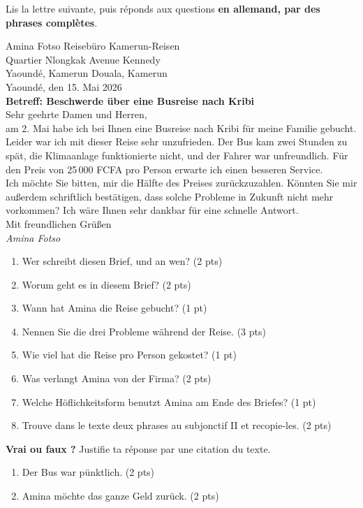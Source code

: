 \documentclass[11pt]{article}
\begin{document}
\begin{exercice}
Lis la lettre suivante, puis réponds aux questions \textbf{en allemand, par des phrases complètes}.
\begin{textebox}
Amina Fotso \hfill Reisebüro Kamerun-Reisen\\
Quartier Nlongkak \hfill Avenue Kennedy\\
Yaoundé, Kamerun \hfill Douala, Kamerun\\[4pt]
Yaoundé, den 15. Mai 2026\\[4pt]
\textbf{Betreff: Beschwerde über eine Busreise nach Kribi}\\[4pt]
Sehr geehrte Damen und Herren,\\[4pt]
am 2. Mai habe ich bei Ihnen eine Busreise nach Kribi für meine Familie gebucht. Leider war ich mit dieser Reise sehr unzufrieden. Der Bus kam zwei Stunden zu spät, die Klimaanlage funktionierte nicht, und der Fahrer war unfreundlich. Für den Preis von 25\,000 FCFA pro Person erwarte ich einen besseren Service.\\[4pt]
Ich möchte Sie bitten, mir die Hälfte des Preises zurückzuzahlen. Könnten Sie mir außerdem schriftlich bestätigen, dass solche Probleme in Zukunft nicht mehr vorkommen? Ich wäre Ihnen sehr dankbar für eine schnelle Antwort.\\[4pt]
Mit freundlichen Grüßen\\
\emph{Amina Fotso}
\end{textebox}
\begin{enumerate}
\item Wer schreibt diesen Brief, und an wen? (2 pts)
\item Worum geht es in diesem Brief? (2 pts)
\item Wann hat Amina die Reise gebucht? (1 pt)
\item Nennen Sie die drei Probleme während der Reise. (3 pts)
\item Wie viel hat die Reise pro Person gekostet? (1 pt)
\item Was verlangt Amina von der Firma? (2 pts)
\item Welche Höflichkeitsform benutzt Amina am Ende des Briefes? (1 pt)
\item Trouve dans le texte deux phrases au subjonctif II et recopie-les. (2 pts)
\end{enumerate}
\textbf{Vrai ou faux ?} Justifie ta réponse par une citation du texte.
\begin{enumerate}
\item[a)] Der Bus war pünktlich. (2 pts)
\item[b)] Amina möchte das ganze Geld zurück. (2 pts)
\end{enumerate}
\end{exercice}
\end{document}
